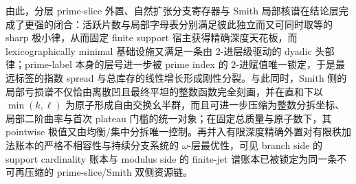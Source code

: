 \noindent
由此，分层 prime-slice 外置、自然扩张分支寄存器与 Smith 局部核谱在结论层完成了更强的闭合：活跃片数与局部字母表分别满足彼此独立而又可同时取等的 sharp 极小律，从而固定 finite support 宿主获得精确深度天花板，而 lexicographically minimal 基础设施又满足一条由 \(2\)-进层级驱动的 dyadic 头部律；prime-label 本身的层号进一步被 prime index 的 \(2\)-进赋值唯一锁定，于是最远标签的指数 spread 与总库存的线性增长形成刚性分裂。与此同时，Smith 侧的局部亏损谱不仅恰由离散凹且最终平坦的整数函数完全刻画，并在直和下以 \(\min(k,\ell)\) 为原子形成自由交换幺半群，而且可进一步压缩为整数分拆坐标、局部二阶曲率与首次 plateau 门槛的统一对象；在固定总质量与原子数下，其 pointwise 极值又由均衡/集中分拆唯一控制。再并入有限深度精确外置对有限秩加法账本的严格不相容性与持续分支系统的 \(\omega\)-层最优性，可见 branch side 的 support cardinality 账本与 modulus side 的 finite-jet 谱账本已被锁定为同一条不可再压缩的 prime-slice/Smith 双侧资源链。

\endinput
